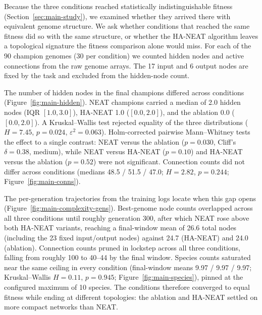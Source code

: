 Because the three conditions reached statistically indistinguishable fitness (Section~\ref{sec:main-study}), we examined whether they arrived there with equivalent genome structure.
We ask whether conditions that reached the same fitness did so with the same structure, or whether the HA-NEAT algorithm leaves a topological signature the fitness comparison alone would miss.
For each of the 90 champion genomes (30 per condition) we counted hidden nodes and active connections from the raw genome arrays.
The 17 input and 6 output nodes are fixed by the task and excluded from the hidden-node count.

The number of hidden nodes in the final champions differed across conditions (Figure~\ref{fig:main-hidden}).
NEAT champions carried a median of 2.0 hidden nodes (IQR $[1.0, 3.0]$), HA-NEAT 1.0 ($[0.0, 2.0]$), and the ablation 0.0 ($[0.0, 2.0]$). A Kruskal--Wallis test rejected equality of the three distributions ($H = 7.45$, $p = 0.024$, $\varepsilon^2 = 0.063$).
Holm-corrected pairwise Mann--Whitney tests  the effect to a single contrast: NEAT versus the ablation ($p = 0.030$, Cliff's $\delta = 0.38$, medium), while NEAT versus HA-NEAT ($p = 0.10$) and HA-NEAT versus the ablation ($p = 0.52$) were not significant.
Connection counts did not differ across conditions (medians 48.5 / 51.5 / 47.0; $H = 2.82$, $p = 0.244$; Figure~\ref{fig:main-conns}).

The per-generation trajectories from the training logs locate when this gap opens (Figure~\ref{fig:main-complexity-gens}).
Best-genome node counts overlapped across all three conditions until roughly generation 300, after which NEAT rose above both HA-NEAT variants, reaching a final-window mean of 26.6 total nodes (including the 23 fixed input/output nodes) against 24.7 (HA-NEAT) and 24.0 (ablation).
Connection counts pruned in lockstep across all three conditions, falling from roughly 100 to 40--44 by the final window.
Species counts saturated near the same ceiling in every condition (final-window means 9.97 / 9.97 / 9.97; Kruskal--Wallis $H = 0.11$, $p = 0.945$; Figure~\ref{fig:main-species}), pinned at the configured maximum of 10 species.
The conditions therefore converged to equal fitness while ending at different topologies: the ablation and HA-NEAT settled on more compact networks than NEAT.

